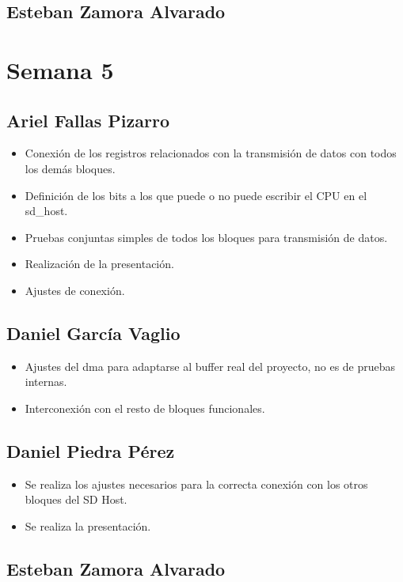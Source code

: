 \subsection{Esteban Zamora Alvarado}

\newpage

\section{Semana 5}
\subsection{Ariel Fallas Pizarro}
\begin{itemize}
\item Conexión de los registros relacionados con la transmisión de datos con todos los demás bloques. 
\item Definición de los bits a los que puede o no puede escribir el CPU en el sd\_host.
\item Pruebas conjuntas simples de todos los bloques para transmisión de datos.
\item Realización de la presentación.
\item Ajustes de conexión.
\end{itemize}

\subsection{Daniel García Vaglio}
\begin{itemize}
\item Ajustes del dma para adaptarse al buffer real del proyecto, no es de pruebas internas.
\item Interconexión con el resto de bloques funcionales. 
\end{itemize}
\subsection{Daniel Piedra Pérez}
\begin{itemize}
\item Se realiza los ajustes necesarios para la correcta conexión con los otros bloques del SD Host.
\item Se realiza la presentación.

\end{itemize}

\subsection{Esteban Zamora Alvarado}

\newpage


